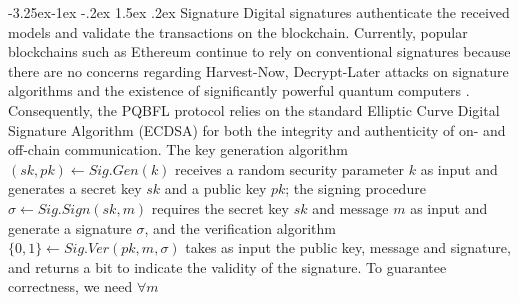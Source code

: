 \documentclass[a4paper,fleqn]{cas-dc}
\makeatletter
\renewcommand\subsubsection{\@startsection{subsubsection}{3}{\z@}%
   {-3.25ex\@plus -1ex \@minus -.2ex}%
   {1.5ex \@plus .2ex}%
   {\normalfont\normalsize}} %
\makeatother
\begin{document}

\subsubsection{Signature}
Digital signatures authenticate the received models and validate the transactions on the blockchain. 
Currently, popular blockchains such as Ethereum \citep{Ethereum} continue to rely on conventional signatures because there are no concerns regarding Harvest-Now, Decrypt-Later attacks on signature algorithms and the existence of significantly powerful quantum computers \citep{Google_blog}.
Consequently, the PQBFL protocol relies on the standard Elliptic Curve Digital Signature Algorithm (ECDSA) for both the integrity and authenticity of on- and off-chain communication.
The key generation algorithm $(sk,pk) \leftarrow Sig.Gen(k)$ receives a random security parameter $k$ as input and generates a secret key $sk$ and a public key $pk$; the signing procedure $ \sigma \leftarrow Sig.Sign(sk,m)$ requires the secret key $sk$ and  message $m$ as input and generate a signature $\sigma$, and  the verification algorithm $\{0,1\} \leftarrow Sig.Ver(pk,m,\sigma)$ takes as input the public key, message and signature, and returns a bit to indicate the validity of the signature. 
To guarantee correctness, we need $\forall m$
\end{document}
